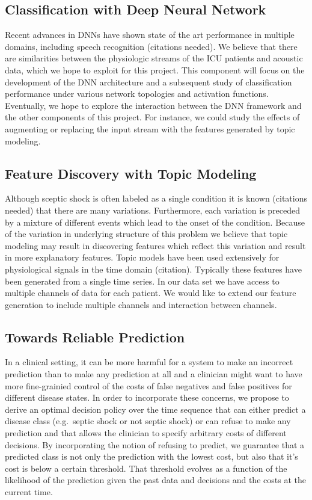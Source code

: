 \documentclass[dvips,12pt]{article}
\begin{document}
\subsection{Classification with Deep Neural Network}

Recent advances in DNNs have shown state of the art performance in multiple domains, including speech recognition (citations needed). We believe that there are similarities between the physiologic streams of the ICU patients and acoustic data, which we hope to exploit for this project. This component will focus on the development of the DNN architecture and a subsequent study of classification performance under various network topologies and activation functions. 
Eventually, we hope to explore the interaction between the DNN framework and the other components of this project. 
For instance, we could study the effects of augmenting or replacing the input stream with the features generated by topic modeling.


\subsection{Feature Discovery with Topic Modeling}

Although sceptic shock is often labeled as a single condition it is known (citations needed) that there are many variations. 
Furthermore, each variation is preceded by a mixture of different events which lead to the onset of the condition. Because of the variation in underlying structure
of this problem we believe that topic modeling may result in discovering features which reflect this variation and result in more explanatory features. Topic models have been used extensively for physiological signals in the time domain (citation). Typically these features have been generated from a single time series. In our data set we have access to multiple channels of data for each patient. We would like to extend our feature generation to include multiple channels and interaction between channels. 

\subsection{Towards Reliable Prediction}
In a clinical setting, it can be more harmful for a system to make an incorrect prediction than to make any prediction at all and a clinician might want to have more fine-grainied control of the costs of false negatives and false positives for different disease states. In order to incorporate these concerns, we propose to derive an optimal decision policy over the time sequence that can either predict a disease class (e.g.\ septic shock or not septic shock) or can refuse to make any prediction and that allows the clinician to specify arbitrary costs of different decisions. By incorporating the notion of refusing to predict, we guarantee that a predicted class is not only the prediction with the lowest cost, but also that it's cost is below a certain threshold. That threshold evolves as a function of the likelihood of the prediction given the past data and decisions and the costs at the current time.
\end{document}
